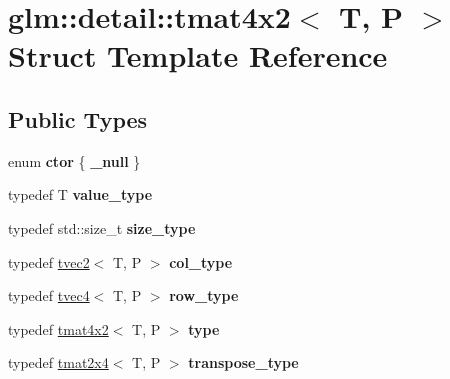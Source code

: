 \hypertarget{structglm_1_1detail_1_1tmat4x2}{}\section{glm\+:\+:detail\+:\+:tmat4x2$<$ T, P $>$ Struct Template Reference}
\label{structglm_1_1detail_1_1tmat4x2}
\subsection*{Public Types}
\begin{DoxyCompactItemize}
\item 
enum {\bfseries ctor} \{ {\bfseries \+\_\+null}
 \}\hypertarget{structglm_1_1detail_1_1tmat4x2_a4266befa296229458f2652dcc4ba4a72}{}\label{structglm_1_1detail_1_1tmat4x2_a4266befa296229458f2652dcc4ba4a72}

\item 
typedef T {\bfseries value\+\_\+type}\hypertarget{structglm_1_1detail_1_1tmat4x2_a69ee68b76c63d5e19001223eb5e7e968}{}\label{structglm_1_1detail_1_1tmat4x2_a69ee68b76c63d5e19001223eb5e7e968}

\item 
typedef std\+::size\+\_\+t {\bfseries size\+\_\+type}\hypertarget{structglm_1_1detail_1_1tmat4x2_aaf03e298b1377068358fc09cdfcd889a}{}\label{structglm_1_1detail_1_1tmat4x2_aaf03e298b1377068358fc09cdfcd889a}

\item 
typedef \hyperlink{structglm_1_1detail_1_1tvec2}{tvec2}$<$ T, P $>$ {\bfseries col\+\_\+type}\hypertarget{structglm_1_1detail_1_1tmat4x2_a7ff0997d9fa4f93eba8a6530ca2cd3f7}{}\label{structglm_1_1detail_1_1tmat4x2_a7ff0997d9fa4f93eba8a6530ca2cd3f7}

\item 
typedef \hyperlink{structglm_1_1detail_1_1tvec4}{tvec4}$<$ T, P $>$ {\bfseries row\+\_\+type}\hypertarget{structglm_1_1detail_1_1tmat4x2_a7800d3c9fae6e2e47ba71cac323aafcf}{}\label{structglm_1_1detail_1_1tmat4x2_a7800d3c9fae6e2e47ba71cac323aafcf}

\item 
typedef \hyperlink{structglm_1_1detail_1_1tmat4x2}{tmat4x2}$<$ T, P $>$ {\bfseries type}\hypertarget{structglm_1_1detail_1_1tmat4x2_a0906a5a3d185ed08196fd6657436eb56}{}\label{structglm_1_1detail_1_1tmat4x2_a0906a5a3d185ed08196fd6657436eb56}

\item 
typedef \hyperlink{structglm_1_1detail_1_1tmat2x4}{tmat2x4}$<$ T, P $>$ {\bfseries transpose\+\_\+type}\hypertarget{structglm_1_1detail_1_1tmat4x2_a2093723021c90d6591afa09a5c8a0bdf}{}\label{structglm_1_1detail_1_1tmat4x2_a2093723021c90d6591afa09a5c8a0bdf}

\end{DoxyCompactItemize}
